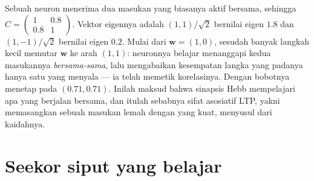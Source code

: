 \begin{example}\label{ex:b3:learning-memory:two-inputs}
Sebuah neuron menerima dua masukan yang biasanya aktif bersama, sehingga $C =
\begin{pmatrix} 1 & 0.8 \\ 0.8 & 1\end{pmatrix}$. Vektor eigennya adalah
$(1,1)/\sqrt{2}$ bernilai eigen $1.8$ dan $(1,-1)/\sqrt{2}$ bernilai
eigen $0.2$. Mulai dari $\mathbf{w} = (1, 0)$,  sesudah
banyak langkah kecil memutar $\mathbf{w}$ ke arah $(1,1)$: neuronnya belajar
menanggapi kedua masukannya \emph{bersama-sama}, lalu mengabaikan kesempatan
langka yang padanya hanya satu yang menyala --- ia telah memetik korelasinya.
Dengan  bobotnya menetap pada $(0.71, 0.71)$. Inilah maksud
bahwa sinapsis Hebb mempelajari apa yang berjalan bersama, dan itulah sebabnya
sifat asosiatif LTP, yakni memasangkan sebuah masukan lemah dengan yang kuat,
menyusul dari kaidahnya.
\end{example}

\section{Seekor siput yang belajar}

